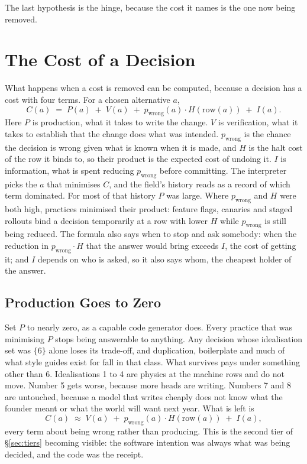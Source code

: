 \documentclass[11pt,oneside]{article}
\theoremstyle{definition}
\theoremstyle{remark}
\begin{document}
The last hypothesis is the hinge, because the cost it names is the one now being removed.

\section{The Cost of a Decision}\label{sec:formula}
What happens when a cost is removed can be computed, because a decision has a cost with
four terms. For a chosen alternative $a$,
\[
C(a) \;=\; P(a) \;+\; V(a) \;+\; p_{\text{wrong}}(a)\cdot H(\text{row}(a)) \;+\; I(a).
\]
Here $P$ is production, what it takes to write the change. $V$ is verification, what it takes
to establish that the change does what was intended. $p_{\text{wrong}}$ is the chance the
decision is wrong given what is known when it is made, and $H$ is the halt cost of the row
it binds to, so their product is the expected cost of undoing it. $I$ is information, what
is spent reducing $p_{\text{wrong}}$ before committing. The interpreter picks the $a$ that
minimises $C$, and the field's history reads as a record of which term dominated. For most
of that history $P$ was large. Where $p_{\text{wrong}}$ and $H$ were both high, practices
minimised their product: feature flags, canaries and staged rollouts bind a decision
temporarily at a row with lower $H$ while $p_{\text{wrong}}$ is still being reduced. The formula also says when to stop and
ask somebody: when the reduction in $p_{\text{wrong}}\cdot H$ that the answer would bring
exceeds $I$, the cost of getting it; and $I$ depends on who is asked, so it also says whom,
the cheapest holder of the answer.  

\subsection{Production Goes to Zero}\label{sec:pcollapse}

Set $P$ to nearly zero, as a capable code generator does. Every practice
that was minimising $P$ stops being answerable to anything. Any decision whose
idealisation set was $\{6\}$ alone loses its trade-off, and duplication, boilerplate and
much of what style guides exist for fall in that class. What survives pays under something
other than 6. Idealisations 1 to 4 are physics at the machine rows and do not move. Number
5 gets worse, because more heads are writing. Numbers 7 and 8 are untouched, because a
model that writes cheaply does not know what the founder meant or what the world will want
next year. What is left is
\[
C(a) \;\approx\; V(a) \;+\; p_{\text{wrong}}(a)\cdot H(\text{row}(a)) \;+\; I(a),
\]
every term about being wrong rather than producing. This is the second tier of
\S\ref{sec:tiers} becoming visible: the software intention was always what was being
decided, and the code was the receipt.
\end{document}
